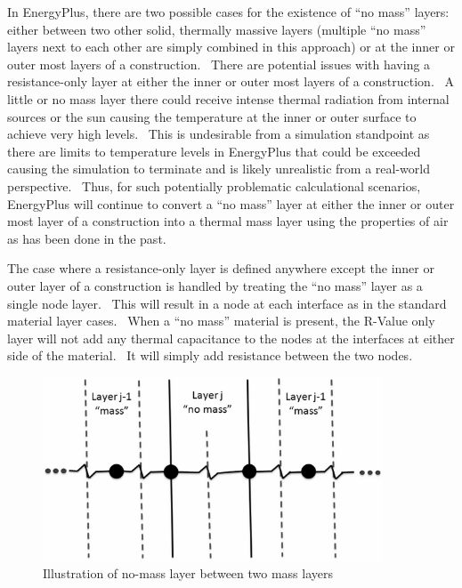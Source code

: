 In EnergyPlus, there are two possible cases for the existence of ``no mass'' layers: either between two other solid, thermally massive layers (multiple ``no mass'' layers next to each other are simply combined in this approach) or at the inner or outer most layers of a construction.~ There are potential issues with having a resistance-only layer at either the inner or outer most layers of a construction.~ A little or no mass layer there could receive intense thermal radiation from internal sources or the sun causing the temperature at the inner or outer surface to achieve very high levels.~ This is undesirable from a simulation standpoint as there are limits to temperature levels in EnergyPlus that could be exceeded causing the simulation to terminate and is likely unrealistic from a real-world perspective.~ Thus, for such potentially problematic calculational scenarios, EnergyPlus will continue to convert a ``no mass'' layer at either the inner or outer most layer of a construction into a thermal mass layer using the properties of air as has been done in the past.

The case where a resistance-only layer is defined anywhere except the inner or outer layer of a construction is handled by treating the ``no mass'' layer as a single node layer.~ This will result in a node at each interface as in the standard material layer cases.~ When a ``no mass'' material is present, the R-Value only layer will not add any thermal capacitance to the nodes at the interfaces at either side of the material.~ It will simply add resistance between the two nodes.

\begin{figure}[hbtp] %
\centering
\includegraphics[width=0.9\textwidth, height=0.9\textheight, keepaspectratio=true]{media/image172.png}
\caption{Illustration of no-mass layer between two mass layers \protect \label{fig:illustration-of-no-mass-layer-between-two}}
\end{figure}


